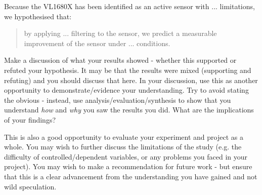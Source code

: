 \documentclass[conference]{IEEEtran}
\begin{document}
Because the VL1680X has been identified as an active sensor with ... limitations, we hypothesised that:
\begin{quote}
    by applying ... filtering to the sensor, we predict a measurable improvement of the sensor under ... conditions.  
\end{quote}

Make a discussion of what your results showed - whether this supported or refuted your hypothesis.  It may be that the results were mixed (supporting and refuting) and you should discuss that here. In your discussion, use this as another opportunity to demonstrate/evidence your understanding. Try to avoid stating the obvious - instead, use analysis/evaluation/synthesis to show that you understand \emph{how} and \emph{why} you saw the results you did.  What are the implications of your findings?  

This is also a good opportunity to evaluate your experiment and project as a whole.  You may wish to further discuss the limitations of the study (e.g. the difficulty of controlled/dependent variables, or any problems you faced in your project).  You may wish to make a recommendation for future work - but ensure that this is a clear advancement from the understanding you have gained and not wild speculation.


 

\end{document}

